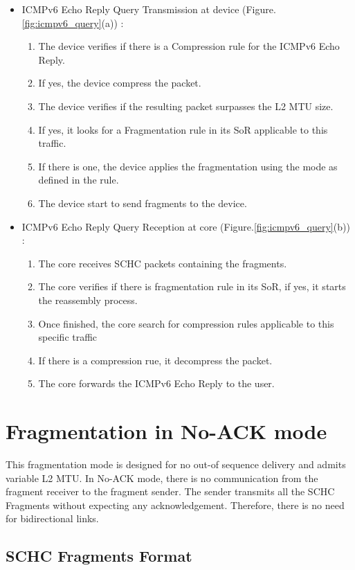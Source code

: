 \begin{itemize}
\item ICMPv6 Echo Reply Query Transmission at device (Figure.\ref{fig:icmpv6_query}(a)) : 
\begin{enumerate}
    \item The device verifies if there is a Compression rule for the ICMPv6 Echo Reply.
    \item If yes, the device compress the packet.
    \item The device verifies if the resulting packet surpasses the L2 MTU size.
    \item If yes, it looks for a Fragmentation rule in its SoR applicable to this traffic.
    \item If there is one, the device applies the fragmentation using the mode as defined in the rule.
    \item The device start to send fragments to the device.
\end{enumerate}

\item ICMPv6 Echo Reply Query Reception at core (Figure.\ref{fig:icmpv6_query}(b)) : 
\begin{enumerate}
    \item The core receives SCHC packets containing the fragments.
    \item The core verifies if there is fragmentation rule in its SoR, if yes, it starts the reassembly process.
    \item Once finished, the core search for compression rules applicable to this specific traffic 
    \item If there is a compression rue, it decompress the packet.
    \item The core forwards the ICMPv6 Echo Reply to the user.
\end{enumerate}
\end{itemize}

\section{Fragmentation in No-ACK mode}

This fragmentation mode is designed for no out-of sequence delivery and admits variable L2 MTU.
In No-ACK mode, there is no communication from the fragment receiver to the fragment sender.  
The sender transmits all the SCHC Fragments without expecting any acknowledgement.  
Therefore, there is no need for bidirectional links.

\subsection{SCHC Fragments Format}

